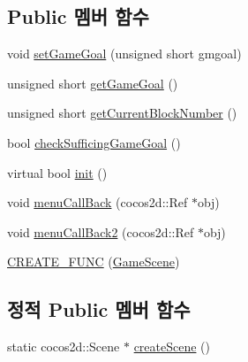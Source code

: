 \subsection*{Public 멤버 함수}
\begin{DoxyCompactItemize}
\item 
void \hyperlink{class_code_lady_j_j_y_1_1game2048_1_1_game_scene_ae674d90ff1c81818e308c99da876fbe8}{set\+Game\+Goal} (unsigned short gmgoal)
\item 
unsigned short \hyperlink{class_code_lady_j_j_y_1_1game2048_1_1_game_scene_a91a4b92af4105f3a0e60b58b96ec0cb5}{get\+Game\+Goal} ()
\item 
unsigned short \hyperlink{class_code_lady_j_j_y_1_1game2048_1_1_game_scene_a102fddfdf3e911218583dbc375786402}{get\+Current\+Block\+Number} ()
\item 
bool \hyperlink{class_code_lady_j_j_y_1_1game2048_1_1_game_scene_a9e9ea53a4ff493d0aafc2197c3bae12c}{check\+Sufficing\+Game\+Goal} ()
\item 
virtual bool \hyperlink{class_code_lady_j_j_y_1_1game2048_1_1_game_scene_ab0ccbc102ba9ceca94daddc2e8f253ba}{init} ()
\item 
void \hyperlink{class_code_lady_j_j_y_1_1game2048_1_1_game_scene_ac748b7487b72bc4722b7bbdb181e7267}{menu\+Call\+Back} (cocos2d\+::\+Ref $\ast$obj)
\item 
void \hyperlink{class_code_lady_j_j_y_1_1game2048_1_1_game_scene_a5fb8ef01d49e87cd898f4d9646dd3034}{menu\+Call\+Back2} (cocos2d\+::\+Ref $\ast$obj)
\item 
\hyperlink{class_code_lady_j_j_y_1_1game2048_1_1_game_scene_ae4a2a6b84c48c11a1be2339b59720b5e}{C\+R\+E\+A\+T\+E\+\_\+\+F\+U\+NC} (\hyperlink{class_code_lady_j_j_y_1_1game2048_1_1_game_scene}{Game\+Scene})
\end{DoxyCompactItemize}
\subsection*{정적 Public 멤버 함수}
\begin{DoxyCompactItemize}
\item 
static cocos2d\+::\+Scene $\ast$ \hyperlink{class_code_lady_j_j_y_1_1game2048_1_1_game_scene_ab573bac307156883fc8c632821b061e4}{create\+Scene} ()
\end{DoxyCompactItemize}
